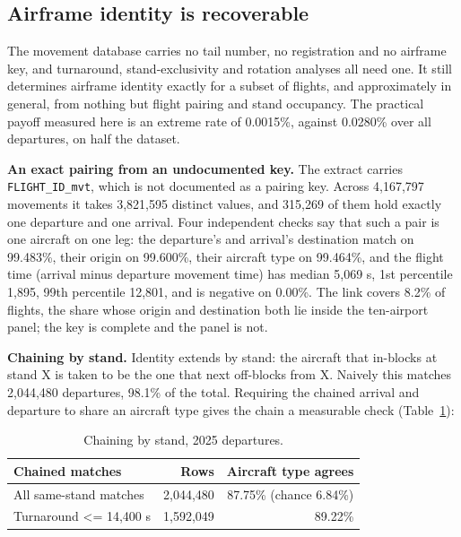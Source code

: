 \documentclass[
  manuscript=article,
  layout=preprint,
  year=2026,
  volume=x,
]{extra/joas}
\begin{document}
\subsection{Airframe identity is recoverable}\label{sec:C.2}

The movement database carries no tail number, no registration and no airframe key, and turnaround, stand-exclusivity and rotation analyses all need one. It still determines airframe identity exactly for a subset of flights, and approximately in general, from nothing but flight pairing and stand occupancy. The practical payoff measured here is an extreme rate of 0.0015\%, against 0.0280\% over all departures, on half the dataset.

\textbf{An exact pairing from an undocumented key.} The extract carries \texttt{FLIGHT\_ID\_mvt}, which is not documented as a pairing key. Across 4,167,797 movements it takes 3,821,595 distinct values, and 315,269 of them hold exactly one departure and one arrival. Four independent checks say that such a pair is one aircraft on one leg: the departure's and arrival's destination match on 99.483\%, their origin on 99.600\%, their aircraft type on 99.464\%, and the flight time (arrival minus departure movement time) has median 5,069 s, 1st percentile 1,895, 99th percentile 12,801, and is negative on 0.00\%. The link covers 8.2\% of flights, the share whose origin and destination both lie inside the ten-airport panel; the key is complete and the panel is not.

\textbf{Chaining by stand.} Identity extends by stand: the aircraft that in-blocks at stand X is taken to be the one that next off-blocks from X. Naively this matches 2,044,480 departures, 98.1\% of the total. Requiring the chained arrival and departure to share an aircraft type gives the chain a measurable check (Table~\ref{tab:21}):

\begin{table}[htbp!]
  \centering
  \small
  \setlength{\tabcolsep}{5pt}\renewcommand{\arraystretch}{1.15}
  \caption{Chaining by stand, 2025 departures.}
  \label{tab:21}
  \begin{tabular*}{\linewidth}{@{\extracolsep{\fill}}lrr}
  \toprule
  \textbf{Chained matches} & \textbf{Rows} & \textbf{Aircraft type agrees} \\
  \midrule
  All same-stand matches & 2,044,480 & 87.75\% (chance 6.84\%) \\
  Turnaround \textless= 14,400 s & 1,592,049 & 89.22\% \\
  \bottomrule
  \end{tabular*}
\end{table}
\end{document}
